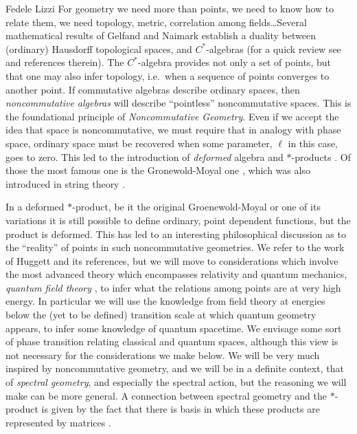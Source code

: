 \begin{artengenv}{Fedele Lizzi}
For geometry we need more than points, we need to know how to relate them, we need topology, metric, correlation among fields\ldots  Several mathematical results of Gelfand and Naimark establish a duality between (ordinary) Hausdorff topological spaces, and $C^*$-algebras (for a quick review see \cite[Chapt.~6]{WSS} and references therein). The $C^*$-algebra provides not only a set of points, but  that one may also infer topology, i.e.\ when a sequence of points converges to another point. If commutative algebras describe ordinary spaces, then \emph{noncommutative algebras} will describe ``pointless'' noncommutative spaces. This is the foundational principle of \emph{Noncommutative Geometry}. Even if we accept the idea that space is noncommutative, we must require that in analogy with phase space, ordinary space must be recovered when some parameter, $\ell$ in this case, goes to zero. This led to the introduction of \emph{deformed} algebra \parencite{Gerstenhaber} and $*$-products \parencite{starprod}. Of those the most famous one is the Gronewold-Moyal one \parencite{Gronewold,Moyal}, which was also introduced in string theory \parencite{FrohlichGawedski, LLS1, SeibergWitten}. 

In a deformed $*$-product, be it the original Groenewold-Moyal or one of its variations \parencite{GalluccioLizziVitale1, GalluccioLizziVitale2,TanasaVitale} it is still possible to define ordinary, point dependent functions, but the product is deformed. This has led to an interesting philosophical discussion as to the ``reality'' of points in such noncommutative geometries. We refer to the work of Huggett \parencite*{Huggett} and its references, but we will move to considerations which involve the most advanced theory which encompasses relativity and quantum mechanics, \emph{quantum field theory} \parencite{Weinberg}, to infer what the relations among points are at very high energy. In particular we will use the knowledge from field theory at energies below the (yet to be defined) transition scale at which quantum geometry appears, to infer some knowledge of quantum spacetime. We  envisage some sort of phase transition relating classical and quantum spaces, although this view is not necessary for the considerations we make below.
We will be very much inspired by noncommutative geometry, and we will be in a definite context, that of \emph{spectral geometry}, and especially the spectral action, but the reasoning we will make can be more general. A connection between spectral geometry and the $*$-product  is given by the fact that there is basis in which these products are represented by matrices \parencite{LizziVitaleReview}.


\end{artengenv}

